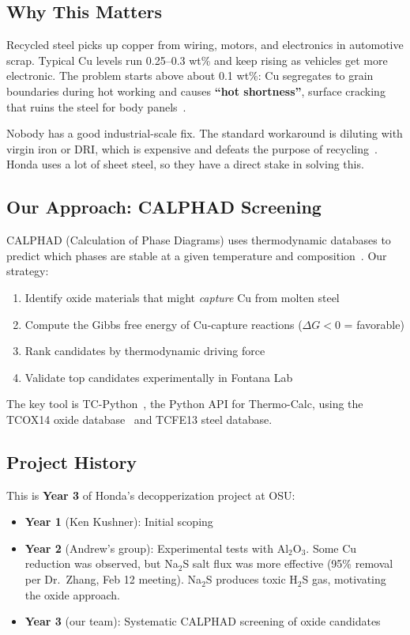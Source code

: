 \documentclass[11pt]{article}
\begin{document}
\subsection{Why This Matters}

Recycled steel picks up copper from wiring, motors, and electronics in automotive scrap. Typical Cu levels run 0.25--0.3 wt\% and keep rising as vehicles get more electronic. The problem starts above about 0.1 wt\%: Cu segregates to grain boundaries during hot working and causes \textbf{``hot shortness''}, surface cracking that ruins the steel for body panels~\cite{Daehn2019}.

Nobody has a good industrial-scale fix. The standard workaround is diluting with virgin iron or DRI, which is expensive and defeats the purpose of recycling~\cite{Daehn2019}. Honda uses a lot of sheet steel, so they have a direct stake in solving this.

\subsection{Our Approach: CALPHAD Screening}

CALPHAD (Calculation of Phase Diagrams) uses thermodynamic databases to predict which phases are stable at a given temperature and composition~\cite{Lukas2007}. Our strategy:

\begin{enumerate}[leftmargin=*]
    \item Identify oxide materials that might \textit{capture} Cu from molten steel
    \item Compute the Gibbs free energy of Cu-capture reactions ($\Delta G < 0$ = favorable)
    \item Rank candidates by thermodynamic driving force
    \item Validate top candidates experimentally in Fontana Lab
\end{enumerate}

The key tool is TC-Python~\cite{Andersson2002, Sundman1985}, the Python API for Thermo-Calc, using the TCOX14 oxide database~\cite{TCOX14} and TCFE13 steel database.

\subsection{Project History}

This is \textbf{Year 3} of Honda's decopperization project at OSU:
\begin{itemize}[leftmargin=*]
    \item \textbf{Year 1} (Ken Kushner): Initial scoping
    \item \textbf{Year 2} (Andrew's group): Experimental tests with Al$_2$O$_3$. Some Cu reduction was observed, but Na$_2$S salt flux was more effective (95\% removal per Dr.\ Zhang, Feb 12 meeting). Na$_2$S produces toxic H$_2$S gas, motivating the oxide approach.
    \item \textbf{Year 3} (our team): Systematic CALPHAD screening of oxide candidates
\end{itemize}
\end{document}
